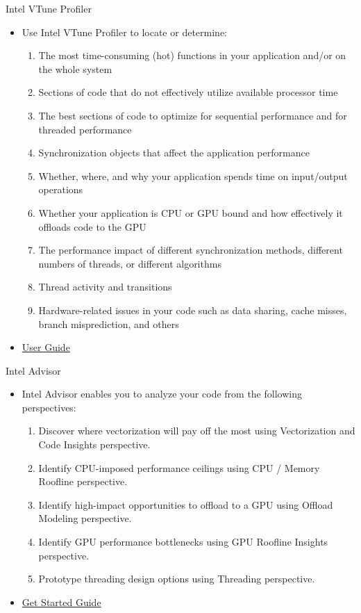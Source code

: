 \documentclass[10pt,t]{beamer}
\begin{document}
\begin{frame}{Intel VTune Profiler}
  \begin{itemize}
  \item Use Intel VTune Profiler to locate or determine:
    \begin{enumerate}
    \item The most time-consuming (hot) functions in your application and/or on the whole system
    \item Sections of code that do not effectively utilize available processor time
    \item The best sections of code to optimize for sequential performance and for threaded performance
    \item Synchronization objects that affect the application performance
    \item Whether, where, and why your application spends time on input/output operations
    \item Whether your application is CPU or GPU bound and how effectively it offloads code to the GPU
    \item The performance impact of different synchronization methods, different numbers of threads, or different algorithms
    \item Thread activity and transitions
    \item Hardware-related issues in your code such as data sharing, cache misses, branch misprediction, and others
    \end{enumerate}
  \item \href{https://software.intel.com/content/www/us/en/develop/documentation/vtune-help/top.html}{\color{lublue}User Guide}
  \end{itemize}
\end{frame}

\begin{frame}{Intel Advisor}
  \begin{itemize}
  \item Intel Advisor enables you to analyze your code from the following perspectives:
    \begin{enumerate}
    \item Discover where vectorization will pay off the most using Vectorization and Code Insights perspective.
    \item Identify CPU-imposed performance ceilings using CPU / Memory Roofline perspective.
    \item Identify high-impact opportunities to offload to a GPU using Offload Modeling perspective.
    \item Identify GPU performance bottlenecks using GPU Roofline Insights perspective.
    \item Prototype threading design options using Threading perspective.
    \end{enumerate}
  \item \href{https://software.intel.com/content/www/us/en/develop/documentation/get-started-with-advisor/top.html}{\color{lublue}Get Started Guide}
  \end{itemize}
\end{frame}
\end{document}
